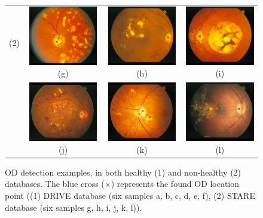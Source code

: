\begin{figure}[t]
\begin{tabular}{c c c c}
    	{(2)} &
    	\includegraphics[width=3.0cm]{Images/Methode/Detection/Stare/im0179.jpg}{(g)} & 
    	\includegraphics[width=3.0cm]{Images/Methode/Detection/Stare/im0096.jpg}{(h)} &
    	\includegraphics[width=3.0cm]{Images/Methode/Detection/Stare/im0110.jpg}{(i)} \\
    	
    	{} &
    	\includegraphics[width=3.0cm]{Images/Methode/Detection/Stare/im0140.jpg}{(j)} & 
    	\includegraphics[width=3.0cm]{Images/Methode/Detection/Stare/im0183.jpg}{(k)} &
    	\includegraphics[width=3.0cm]{Images/Methode/Detection/Stare/im0177.jpg}{(l)} \\
    \end{tabular}

    
    \caption{\label{examples_detection}OD detection examples, in both healthy (1) and non-healthy (2) databases. The blue cross ($\times$) represents the found OD location point ((1) DRIVE database (six samples a, b, c, d, e, f), (2) STARE database (six samples g, h, i, j, k, l)).}
\end{figure}
